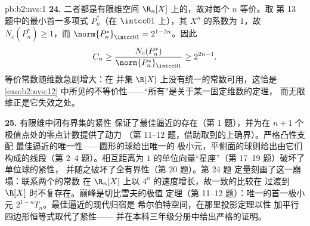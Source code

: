 \begin{solution}{pb:b2:nvs:1}
\textbf{24.} 二者都是有限维空间
$\R_n[X]$ 上的，故对每个 $n$ 等价。取
第 13 题中的最小首一多项式 $P^*_n$（在 $\intcc01$ 上），其
$X^n$ 的系数为 $1$，故 $N_c(P^*_n) \geq 1$，而
$\norm{P^*_n}_{\intcc01} = 2^{1-2n}$。因此
\[
C_n \geq \frac{N_c(P^*_n)}{\norm{P^*_n}_{\intcc01}}
\geq 2^{2n-1} .
\]
等价常数随维数急剧增大：在
并集 $\R[X]$ 上没有统一的常数可用，这恰是
\cref{exo:b2:nvs:12} 中所见的不等价性——“所有”是关于某一固定维数的定理，
而无限维正是它失效之处。

\textbf{25.} 有限维中闭有界集的紧性
保证了最佳逼近的存在（第
1 题），并为在 $n + 1$ 个极值点处的零点计数提供了动力
（第 11--12 题，借助取到的上确界）。严格凸性支配
最佳逼近的唯一性——圆形的球给出唯一的
极小元，平侧面的球则给出由它们构成的线段（第
2--4 题）。相互距离为
$1$ 的单位向量“星座”（第 17--19 题）破坏了单位球的紧性，
并随之破坏了全有界性（第 20 题）。第 24 题
定量刻画了这一崩塌：联系两个的常数
在 $\R_n[X]$ 上以 $4^n$ 的速度增长，故一致的比较在
过渡到 $\R[X]$ 时不复存在。巅峰是切比雪夫的极值
定理（第 11--12 题）：唯一的首一极小元
$2^{1-n}T_n$。最佳逼近的现代归宿是
希尔伯特空间，在那里投影定理以性
加平行四边形恒等式取代了紧性——
并在本科三年级分册中给出严格的证明。
\end{solution}
